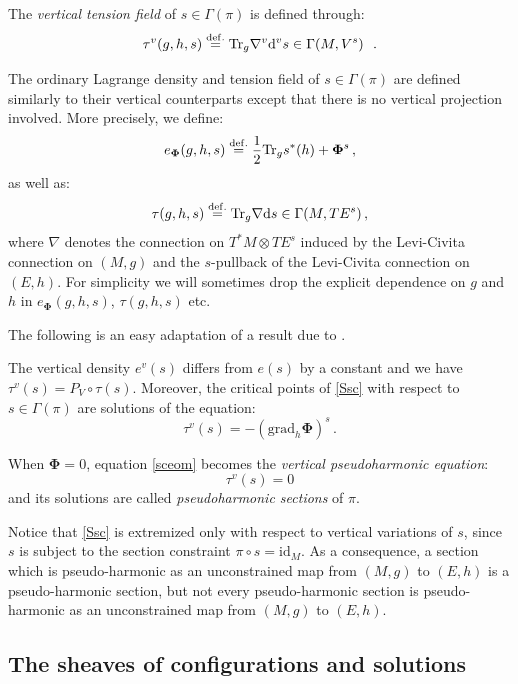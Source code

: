 \documentclass[10pt, cmp, numbook, final, a4paper]{svjour}
\newcommand*{\SavedEqref}{}
\let\SavedEqref\eqref
\renewcommand*{\eqref}[1]{%
  \begingroup
    \hypersetup{
      linkcolor=blue,
      linkbordercolor=blue,
    }%
    \SavedEqref{#1}%
  \endgroup
}
\newcommand{\eqdef}{\stackrel{{\rm def.}}{=}}
\def\dd{\mathrm{d}}
\newcommand{\be}{\begin{equation*}}
\newcommand{\ee}{\end{equation*}}
\newcommand{\ben}{\begin{equation}}
\newcommand{\een}{\end{equation}}
\newcommand{\id}{\mathrm{id}}
\newcommand{\Tr}{\mathrm{Tr}}
\def\bPhi{\mathbf{\Phi}}
\def\grad{\mathrm{grad}}
\begin{document}
\begin{definition}
The {\em vertical tension field} of $s\in \Gamma(\pi)$ is defined
through:
\be
\label{tensionvert}
\tau^v(g, h, s)\eqdef \Tr_{g}\nabla^v \dd^v s \in \Gamma(M,V^s)~~.
\ee
\end{definition}

\begin{remark}
The ordinary Lagrange density and tension field of $s\in\Gamma(\pi)$
are defined similarly to their vertical counterparts except that there
is no vertical projection involved. More precisely, we define:
\be
e_\bPhi(g,h,s)\eqdef \frac{1}{2}\Tr_{g} s^\ast (h)+\bPhi^s\, ,
\ee
as well as:
\be
\tau(g, h, s)\eqdef \Tr_{g}\nabla \dd s \in \Gamma(M,TE^s)\, ,
\ee
where $\nabla$ denotes the connection on $T^{\ast}M\otimes TE^{s}$
induced by the Levi-Civita connection on $(M,g)$ and the $s$-pullback
of the Levi-Civita connection on $(E,h)$. For simplicity we will
sometimes drop the explicit dependence on $g$ and $h$ in
$e_{\bPhi}(g,h,s)$, $\tau(g, h, s)$ etc.
\end{remark}

\noindent
The following is an easy adaptation of a result due to \cite{Wood1}.

\begin{proposition}
The vertical density $e^v(s)$ differs from $e(s)$ by a constant and we
have $\tau^v(s)=P_V\circ\tau(s)$. Moreover, the critical points
of \eqref{Ssc} with respect to $s\in \Gamma(\pi)$ are solutions of the
equation:
\ben
\label{sceom}
\tau^v(s)=-(\grad_h\bPhi)^s\, .
\een
\end{proposition}

\begin{remark}
When $\bPhi=0$, equation \eqref{sceom} becomes the {\em vertical
pseudoharmonic equation}:
\be
\label{pseudoharm}
\tau^v(s)=0
\ee
and its solutions are called {\em pseudoharmonic sections} of $\pi$. 
\end{remark}	
	
\noindent 
Notice that \eqref{Ssc} is extremized only with respect to vertical
variations of $s$, since $s$ is subject to the section constraint
$\pi\circ s=\id_M$. As a consequence, a section which is
pseudo-harmonic as an unconstrained map from $(M,g)$ to $(E,h)$ is a
pseudo-harmonic section, but not every pseudo-harmonic section is
pseudo-harmonic as an unconstrained map from $(M,g)$ to $(E,h)$.

\subsection{The sheaves of configurations and solutions}
\end{document}
